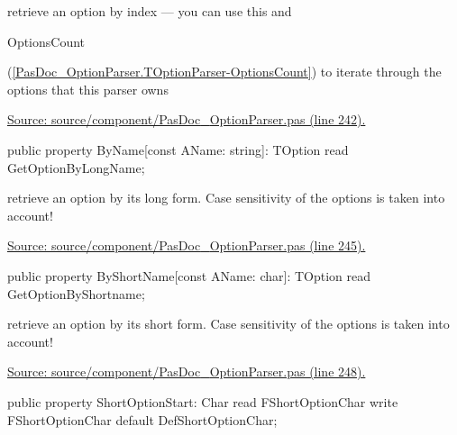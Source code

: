 \documentclass{report}
\newif\ifpdf
\begin{document}
\begin{list}{}
\begin{flushleft}
\ifpdf
\end{flushleft}
\fi


\par retrieve an option by index --- you can use this and \begin{ttfamily}OptionsCount\end{ttfamily}(\ref{PasDoc_OptionParser.TOptionParser-OptionsCount}) to iterate through the options that this parser owns\par
\href{https://github.com/pasdoc/pasdoc/blob/master/source/component/PasDoc_OptionParser.pas#L242}{Source: source/component/PasDoc{\_}OptionParser.pas (line 242).}\label{PasDoc_OptionParser.TOptionParser-ByName}
\item[\textbf{ByName}\hfill]
\ifpdf
\begin{flushleft}
\fi
\begin{ttfamily}
public property ByName[const AName: string]: TOption read GetOptionByLongName;\end{ttfamily}

\ifpdf
\end{flushleft}
\fi


\par retrieve an option by its long form. Case sensitivity of the options is taken into account!\par
\href{https://github.com/pasdoc/pasdoc/blob/master/source/component/PasDoc_OptionParser.pas#L245}{Source: source/component/PasDoc{\_}OptionParser.pas (line 245).}\label{PasDoc_OptionParser.TOptionParser-ByShortName}
\item[\textbf{ByShortName}\hfill]
\ifpdf
\begin{flushleft}
\fi
\begin{ttfamily}
public property ByShortName[const AName: char]: TOption read GetOptionByShortname;\end{ttfamily}

\ifpdf
\end{flushleft}
\fi


\par retrieve an option by its short form. Case sensitivity of the options is taken into account!\par
\href{https://github.com/pasdoc/pasdoc/blob/master/source/component/PasDoc_OptionParser.pas#L248}{Source: source/component/PasDoc{\_}OptionParser.pas (line 248).}\label{PasDoc_OptionParser.TOptionParser-ShortOptionStart}
\item[\textbf{ShortOptionStart}\hfill]
\ifpdf
\begin{flushleft}
\fi
\begin{ttfamily}
public property ShortOptionStart: Char read FShortOptionChar write FShortOptionChar default DefShortOptionChar;\end{ttfamily}


\end{flushleft}
\end{list}
\end{document}
